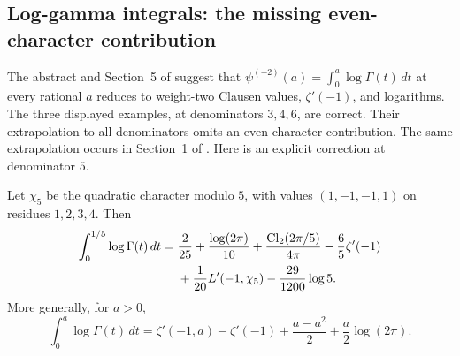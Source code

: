 \subsection{Log-gamma integrals: the missing even-character contribution}
\label{corr:loggamma}

The abstract and Section~5 of
 suggest that
$\psi^{(-2)}(a)=\int_0^a\log\Gamma(t)\,dt$ at every rational $a$ reduces
to weight-two Clausen values, $\zeta'(-1)$, and logarithms.  The three
displayed examples, at denominators $3,4,6$, are correct.  Their
extrapolation to all denominators omits an even-character contribution.
The same extrapolation occurs in Section~1 of
.
Here is an explicit correction at denominator $5$.

\begin{proposition}
\label{corr:loggamma-five}
Let $\chi_5$ be the quadratic character modulo $5$, with values
$(1,-1,-1,1)$ on residues $1,2,3,4$.  Then
\begin{align}
 \int_0^{1/5}\log\Gamma(t)\,dt
 ={}&\frac{2}{25}+\frac{\log(2\pi)}{10}
       +\frac{\operatorname{Cl}_2(2\pi/5)}{4\pi}
       -\frac65\zeta'(-1) \notag\\
    &+\frac1{20}L'(-1,\chi_5)-\frac{29}{1200}\log5.
 \label{corr:loggamma-five-formula}
\end{align}
More generally, for $a>0$,
\begin{equation}\label{corr:loggamma-general}
 \int_0^a\log\Gamma(t)\,dt
 =\zeta'(-1,a)-\zeta'(-1)
       +\frac{a-a^2}{2}+\frac a2\log(2\pi).
\end{equation}
\end{proposition}
